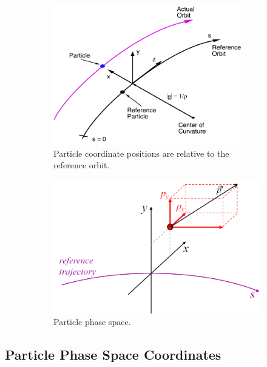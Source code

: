 \documentclass{hitec}
\begin{document}
\begin{figure}[tb]
  \centering
  \begin{subfigure}[b]{0.48\textwidth}
    \includegraphics[width=0.9\textwidth]{local-coords.pdf}
    \caption{Particle coordinate positions are relative to the reference orbit.}
    \label{f:part.coords}
  \end{subfigure}
  \hfil
  \begin{subfigure}[b]{0.48\textwidth}
    \includegraphics[width=\textwidth]{CoordinateSystem1.pdf}
    \caption{Particle phase space.}
    \label{f:phase.space}
  \end{subfigure}
  \caption{}
\end{figure}

\subsection{Particle Phase Space Coordinates}
\end{document}
